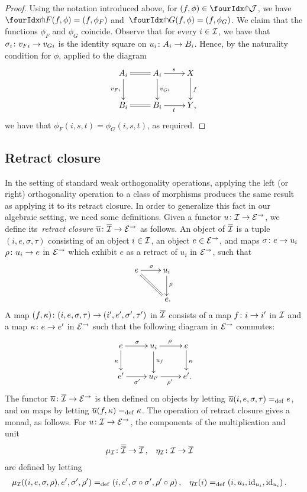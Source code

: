 \documentclass[reqno,10pt,a4paper,oneside,draft]{amsart}
\begin{document}
\begin{proof} Using the notation introduced above, for $(f, \phi) \in \liftr{\cal{J}}$, we have $\liftr{F}(f, \phi) = (f, \phi_F)$ and~$\liftr{G}(f, \phi) = (f, \phi_G)$.
We claim that the functions $\phi_F$ and $\phi_G$ coincide.
Observe that for every $i \in \cal{I}$, we have that $\sigma_i \co v_{Fi} \to v_{Gi}$ is the identity square on $u_i \co A_i \to B_i$.
Hence, by the naturality condition for $\phi$, applied to the diagram
\[
\xymatrix{
  A_i
  \ar@{=}[r]
  \ar[d]_{v_{Fi}}
&
  A_i
  \ar[d]^{v_{Gi}}
  \ar[r]^{s}
&
  X
  \ar[d]^{f}
\\
  B_i
  \ar@{=}[r]
&
  B_i
  \ar[r]_{t}
&
  Y
\rlap{,}}
\]
we have that $\phi_F(i, s, t) = \phi_G(i, s, t)$, as required.
\end{proof}

\subsection*{Retract closure}
In the setting of standard weak orthogonality operations,  applying the left (or right) orthogonality operation to a class of morphisms produces the same result as applying it to its retract closure.
In order to generalize  this fact in our algebraic setting, we need some definitions.
Given a functor $u \co \cal{I} \to \calE^\to$, we define its~\emph{retract closure} $\overline{u} \co \overline{\cal{I}} \to \catE^\to$ as follows.
An object of $\overline{\cal{I}}$ is a tuple~$(i, e, \sigma, \tau)$ consisting of an object $i \in \cal{I}$, an object $e \in \catE^\to$, and maps $\sigma \co e \rightarrow u_i$ $\rho \co u_i \rightarrow e$ in $\catE^\to$ which exhibit $e$ as a retract of $u_i$ in $\catE^\to$, \ie such that
\[
\xymatrix{
  e
  \ar[r]^{\sigma}
  \ar@{=}[dr]
&
  u_i
  \ar[d]^{\rho}
\\&
  e
\rlap{.}}
\]
A map $(f, \kappa) \co (i, e, \sigma, \tau) \to (i', e', \sigma', \tau')$ in $\overline{\cal{I}}$ consists of a map $f \co i \to i'$ in $\cal{I}$ and a map $\kappa \co e \rightarrow e'$ in $\catE^\to$ such that the following diagram in $\catE^\to$ commutes:
\[
\xymatrix{
  e
  \ar[r]^{\sigma}
  \ar[d]_{\kappa}
&
  u_i
  \ar[r]^{\rho}
  \ar[d]^{u_f}
&
  e
  \ar[d]^{\kappa}
\\
  e'
  \ar[r]_{\sigma'}
&
  u_{i'}
  \ar[r]_{\rho'}
&
  e'
\rlap{.}}
\]
The functor $\overline{u} \co \overline{\cal{I}} \to \catE^\to$ is then defined on objects by letting $\overline{u}(i, e, \sigma, \tau) \defeq e$, and on maps by letting $\overline{u}(f, \kappa) \defeq \kappa$.
The operation of retract closure gives a monad, as follows. For $u \co \cal{I} \to \catE^\to$, the components of the multiplication and unit
\[
\begin{aligned}
  \mu_\cal{I} &\co \overline{\overline{\cal{I}}} \to \overline{\cal{I}}
\, , &
  \eta_\cal{I} &\co \cal{I} \to \overline{\cal{I}}
\end{aligned}
\]
are defined by letting
\[
\begin{aligned}
  \mu_\cal{I}((i, e, \sigma, \rho), e', \sigma', \rho') &\defeq (i, e', \sigma \cc \sigma', \rho' \cc \rho)
\, , &
  \eta_\cal{I}(i) &\defeq (i, u_i, \id_{u_i}, \id_{u_i})
\, .
\end{aligned}
\]
\end{document}
